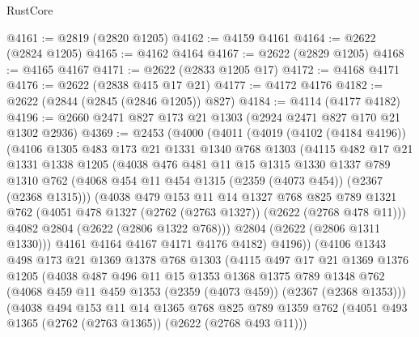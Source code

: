 \begin{lexlean}{RustCore}
\begin{coremodule}
@4161 := @2819 (@2820 @1205)
@4162 := @4159 @4161
@4164 := @2622 (@2824 @1205)
@4165 := @4162 @4164
@4167 := @2622 (@2829 @1205)
@4168 := @4165 @4167
@4171 := @2622 (@2833 @1205 @17)
@4172 := @4168 @4171
@4176 := @2622 (@2838 @415 @17 @21)
@4177 := @4172 @4176
@4182 := @2622 (@2844 (@2845 (@2846 @1205)) @827)
@4184 := @4114 (@4177 @4182)
@4196 := @2660 @2471 @827 @173 @21 @1303 (@2924 @2471 @827 @170 @21 @1302 @2936)
@4369 := @2453
    (@4000
      (@4011
        (@4019
          (@4102 (@4184 @4196))
          (@4106
            @1305
            @483
            @173
            @21
            @1331
            @1340
            @768
            @1303
            (@4115
              @482
              @17
              @21
              @1331
              @1338
              @1205
              (@4038
                @476
                @481
                @11
                @15
                @1315
                @1330
                @1337
                @789
                @1310
                @762
                (@4068 @454 @11 @454 @1315 (@2359 (@4073 @454)) (@2367 (@2368 @1315)))
                (@4038
                  @479
                  @153
                  @11
                  @14
                  @1327
                  @768
                  @825
                  @789
                  @1321
                  @762
                  (@4051 @478 @1327 (@2762 (@2763 @1327)) (@2622 (@2768 @478 @11)))
                  @4082
                  @2804
                  (@2622 (@2806 @1322 @768)))
                @2804
                (@2622 (@2806 @1311 @1330)))
              @4161
              @4164
              @4167
              @4171
              @4176
              @4182)
            @4196))
        (@4106
          @1343
          @498
          @173
          @21
          @1369
          @1378
          @768
          @1303
          (@4115
            @497
            @17
            @21
            @1369
            @1376
            @1205
            (@4038
              @487
              @496
              @11
              @15
              @1353
              @1368
              @1375
              @789
              @1348
              @762
              (@4068 @459 @11 @459 @1353 (@2359 (@4073 @459)) (@2367 (@2368 @1353)))
              (@4038
                @494
                @153
                @11
                @14
                @1365
                @768
                @825
                @789
                @1359
                @762
                (@4051 @493 @1365 (@2762 (@2763 @1365)) (@2622 (@2768 @493 @11)))

\end{coremodule}
\end{lexlean}
